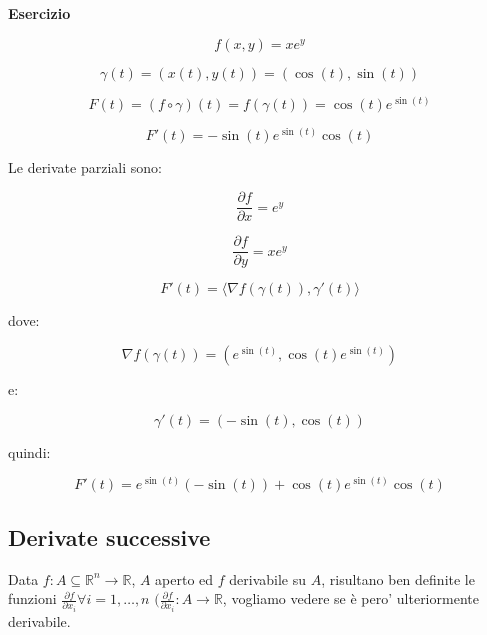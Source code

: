 \documentclass[../appunti-analisi.tex]{subfiles}
\begin{document}
\textbf{Esercizio} 

\[
    f(x,y)= x e ^{y}
\]

\[
    \gamma(t) = (x(t), y(t)) = (\cos (t) , \sin (t))
\]

\[
    F(t) = (f \circ \gamma) (t) = f(\gamma(t)) = \cos (t) e ^{\sin (t)}
\]

\[
    F'(t) = -\sin (t) e ^{\sin (t)} \cos (t)
\]

Le derivate parziali sono:

\[
    \frac{\partial f}{\partial x} = e ^{y} 
\]

\[
    \frac{\partial f}{\partial y} = x e ^{y}
\]

\[
    F'(t) = \langle \nabla f(\gamma(t)), \gamma'(t) \rangle  
\]

dove:

\[
    \nabla f(\gamma(t)) = (e ^{\sin (t)}, \cos (t) e ^{\sin (t)})
\]

e:

\[
    \gamma'(t) = (-\sin (t), \cos (t))
\]

quindi:

\[
    F'(t) = e ^{\sin(t)} (- \sin (t)) + \cos (t) e ^{\sin (t)}\cos (t)
\]


\newpage

\subsection{Derivate successive}

Data $f: A \subseteq \mathbb{R}^{n} \rightarrow \mathbb{R}$, $A$ aperto ed $f$ derivabile su $A$, risultano ben definite le funzioni $\frac{\partial f}{\partial x_i} \forall i=1,\ldots,n$ $(\frac{\partial f}{\partial x_i}: A \rightarrow \mathbb{R}$, vogliamo vedere se è pero' ulteriormente derivabile.

\end{document}
